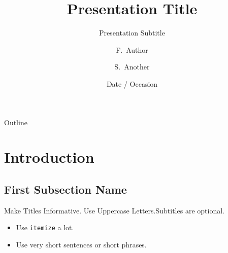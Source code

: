 \documentclass[
aspectratio=169,
11pt,
c,
compress,
hyperref={
  colorlinks=false,
}]{beamer}
\title[Short Paper Title] %
{Presentation Title}
\subtitle
{Presentation Subtitle} %
\author[Author, Another] %
{F.~Author\inst{1} \and S.~Another\inst{2}}
\institute[Universities of Somewhere and Elsewhere] %
{
  \inst{1}%
  Department of Computer Science\\
  University of Somewhere
  \and
  \inst{2}%
  Department of Theoretical Philosophy\\
  University of Elsewhere}
\date[Short Occasion] %
{Date / Occasion}
\begin{document}
\begin{frame}
  \titlepage
\end{frame}

\begin{frame}{Outline}
  \tableofcontents
\end{frame}



\section{Introduction}

\subsection[Short First Subsection Name]{First Subsection Name}

\begin{frame}{Make Titles Informative. Use Uppercase Letters.}{Subtitles are optional.}

  \begin{itemize}
    \item
          Use \texttt{itemize} a lot.
    \item
          Use very short sentences or short phrases.
  \end{itemize}
\end{frame}
\end{document}
